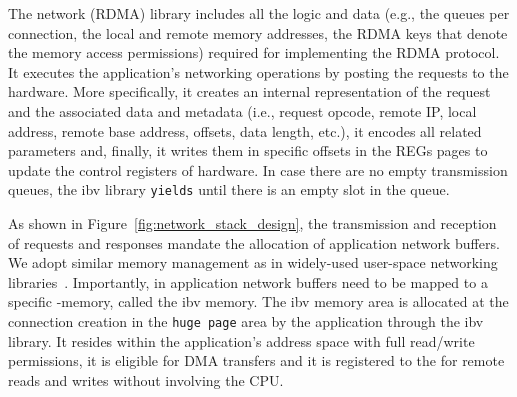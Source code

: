   The network (RDMA) library includes all the logic and data (e.g., the queues per connection, the local and remote memory addresses, the RDMA keys that denote the memory access permissions) required for implementing the RDMA protocol. It executes the application's networking operations by posting the requests to the hardware. More specifically, it creates an internal representation of the request and the associated data and metadata (i.e., request opcode, remote IP, local address, remote base address, offsets, data length, etc.), it encodes all related parameters and, finally, it writes them in specific offsets in the REGs pages to update the control registers of \projecttitle{} hardware. In case there are no empty transmission queues, the ibv library {\tt yields} until there is an empty slot in the queue.



As shown in Figure~\ref{fig:network_stack_design}, the transmission and reception of requests and responses mandate the allocation of application network buffers. We adopt similar memory management as in widely-used user-space networking libraries~\cite{erpc, dpdk, rdma}. Importantly, in \projecttitle{} application network buffers need to be mapped to a specific \projecttitle{}-memory, called the ibv memory. The ibv memory area is allocated at the connection creation in the {\tt huge page} area by the application through the ibv library. It resides within the application's address space with full read/write permissions, it is eligible for DMA transfers and it is registered to the \projecttitle{} for remote reads and writes without involving the CPU. 




